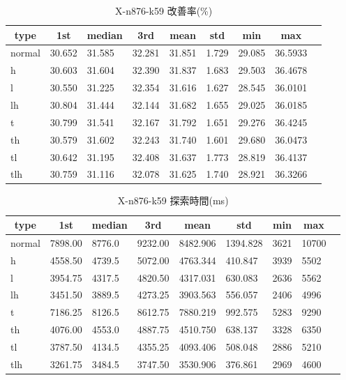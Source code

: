 \begin{table}[htbp]
    \caption{X-n876-k59 改善率(\%)}
    \begin{tabular}{|l|l|l|l|l|l|l|l|l|}\hline
    \multicolumn{1}{|c|}{\textbf{type}}
    &\multicolumn{1}{|c|}{\textbf{1st}}
    &\multicolumn{1}{c|}{\textbf{median}}
    &\multicolumn{1}{c|}{\textbf{3rd}}
    &\multicolumn{1}{c|}{\textbf{mean}}
    &\multicolumn{1}{c|}{\textbf{std}}
    &\multicolumn{1}{c|}{\textbf{min}}
    &\multicolumn{1}{c|}{\textbf{max}}\\\hline
	normal & 30.652 & 31.585 & 32.281 & 31.851 & 1.729 & 29.085 & 36.5933\\\hline
	h & 30.603 & 31.604 & 32.390 & 31.837 & 1.683 & 29.503 & 36.4678\\\hline
	l & 30.550 & 31.225 & 32.354 & 31.616 & 1.627 & 28.545 & 36.0101\\\hline
	lh & 30.804 & 31.444 & 32.144 & 31.682 & 1.655 & 29.025 & 36.0185\\\hline
	t & 30.799 & 31.541 & 32.167 & 31.792 & 1.651 & 29.276 & 36.4245\\\hline
	th & 30.579 & 31.602 & 32.243 & 31.740 & 1.601 & 29.680 & 36.0473\\\hline
	tl & 30.642 & 31.195 & 32.408 & 31.637 & 1.773 & 28.819 & 36.4137\\\hline
	tlh & 30.759 & 31.116 & 32.078 & 31.625 & 1.740 & 28.921 & 36.3266\\\hline
	\end{tabular}
\end{table}
\begin{table}[htbp]
    \caption{X-n876-k59 探索時間(ms)}
    \begin{tabular}{|l|l|l|l|l|l|l|l|l|}\hline
    \multicolumn{1}{|c|}{\textbf{type}}
    &\multicolumn{1}{|c|}{\textbf{1st}}
    &\multicolumn{1}{c|}{\textbf{median}}
    &\multicolumn{1}{c|}{\textbf{3rd}}
    &\multicolumn{1}{c|}{\textbf{mean}}
    &\multicolumn{1}{c|}{\textbf{std}}
    &\multicolumn{1}{c|}{\textbf{min}}
    &\multicolumn{1}{c|}{\textbf{max}}\\\hline
	normal & 7898.00 & 8776.0 & 9232.00 & 8482.906 & 1394.828 & 3621 & 10700\\\hline
	h & 4558.50 & 4739.5 & 5072.00 & 4763.344 & 410.847 & 3939 & 5502\\\hline
	l & 3954.75 & 4317.5 & 4820.50 & 4317.031 & 630.083 & 2636 & 5562\\\hline
	lh & 3451.50 & 3889.5 & 4273.25 & 3903.563 & 556.057 & 2406 & 4996\\\hline
	t & 7186.25 & 8126.5 & 8612.75 & 7880.219 & 992.575 & 5283 & 9290\\\hline
	th & 4076.00 & 4553.0 & 4887.75 & 4510.750 & 638.137 & 3328 & 6350\\\hline
	tl & 3787.50 & 4134.5 & 4355.25 & 4093.406 & 508.048 & 2886 & 5210\\\hline
	tlh & 3261.75 & 3484.5 & 3747.50 & 3530.906 & 376.861 & 2969 & 4600\\\hline
	\end{tabular}
\end{table}
